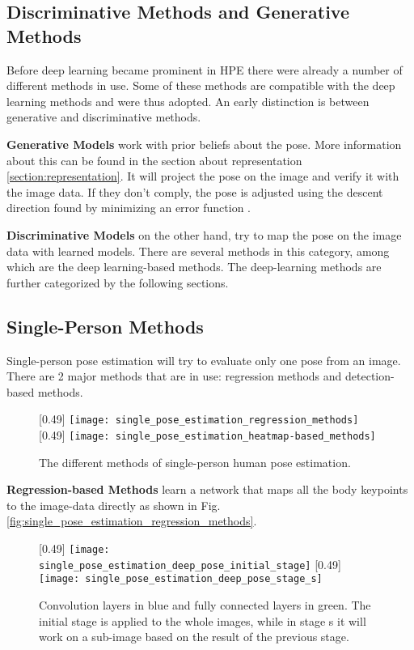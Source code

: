 \subsection{Discriminative Methods and Generative Methods}
Before deep learning became prominent in \gls{HPE} there were already a number of different methods in use.
Some of these methods are compatible with the deep learning methods and were thus adopted.
An early distinction is between generative and discriminative methods.

\textbf{Generative Models} work with prior beliefs about the pose.
More information about this can be found in the section about representation \ref{section:representation}.
It will project the pose on the image and verify it with the image data.
If they don't comply, the pose is adjusted using the descent direction found by minimizing an error function \cite{Pons-Moll2011}.

\textbf{Discriminative Models} on the other hand, try to map the pose on the image data with learned models.
There are several methods in this category, among which are the deep learning-based methods.
The deep-learning methods are further categorized by the following sections.

\subsection{Single-Person Methods}
Single-person pose estimation will try to evaluate only one pose from an image.
There are 2 major methods that are in use: regression methods and detection-based methods.

\begin{figure}
	\centering
	[0.49\textwidth]{%
		\texttt{[image: single\_pose\_estimation\_regression\_methods]}%
	}
	[0.49\textwidth]{%
		\texttt{[image: single\_pose\_estimation\_heatmap-based\_methods]}%
	}
	\caption{The different methods of single-person human pose estimation.\cite{Zheng2012}}
	\label{fig:single_pose_estimation}
\end{figure}

\textbf{Regression-based Methods} learn a network that maps all the body keypoints to the image-data directly as shown in Fig. \ref{fig:single_pose_estimation_regression_methods}.

\begin{figure}
	\centering
	[0.49\textwidth]{%
		\texttt{[image: single\_pose\_estimation\_deep\_pose\_initial\_stage]}%
	}
	[0.49\textwidth]{%
		\texttt{[image: single\_pose\_estimation\_deep\_pose\_stage\_s]}%
	}
	\caption{
		Convolution layers in blue and fully connected layers in green.
		The initial stage is applied to the whole images, while in stage s it will work on a sub-image based on the result of the previous stage.\cite{Toshev2014}
	}
	\label{fig:deep_pose}
\end{figure}

